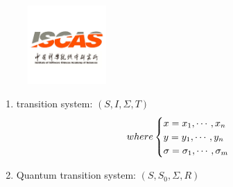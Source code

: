 \documentclass[aspectratio=1610,18pt]{ctexbeamer}
\title{}
\author{高丁超}
\begin{document}
\begin{frame}[plain]
  \titlepage
  \begin{figure}
    \centering
    \includegraphics[width=3cm]{iscas.png}
  \end{figure}
\end{frame}

\begin{frame}
  \begin{enumerate}
    \Large
    \item  transition system: $(S, I, \Sigma, T)$
    \begin{equation}
      where
      \begin{cases}
        x = x_1, \cdots, x_n\\
        y = y_1, \cdots, y_n\\
        \sigma = \sigma_1, \cdots, \sigma_m
      \end{cases}
      \notag
    \end{equation}
    \item Quantum transition system: $(S, S_0, \Sigma, R)$
  \end{enumerate}
\end{frame}
\end{document}
